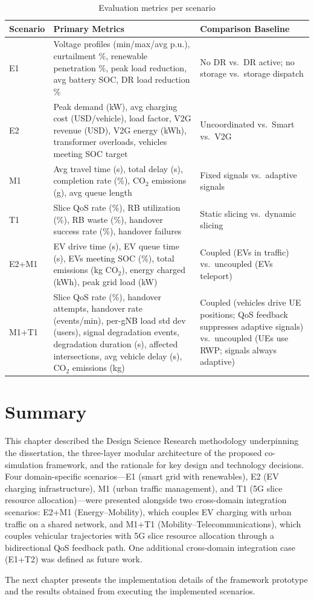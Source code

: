 \begin{table}[h]
    \centering
    \caption{Evaluation metrics per scenario}
    \label{tab:metrics_summary}
    \small
    \begin{tabular}{|p{1.5cm}|p{5.0cm}|p{6.0cm}|}
        \hline
        \textbf{Scenario} & \textbf{Primary Metrics} & \textbf{Comparison Baseline} \\
        \hline
        E1 & Voltage profiles (min/max/avg p.u.), curtailment \%, renewable penetration \%, peak load reduction, avg battery SOC, DR load reduction \% & No DR vs.\ DR active; no storage vs.\ storage dispatch \\
        \hline
        E2 & Peak demand (kW), avg charging cost (USD/vehicle), load factor, V2G revenue (USD), V2G energy (kWh), transformer overloads, vehicles meeting SOC target & Uncoordinated vs.\ Smart vs.\ V2G \\
        \hline
        M1 & Avg travel time (s), total delay (s), completion rate (\%), CO$_2$ emissions (g), avg queue length & Fixed signals vs.\ adaptive signals \\
        \hline
        T1 & Slice QoS rate (\%), RB utilization (\%), RB waste (\%), handover success rate (\%), handover failures & Static slicing vs.\ dynamic slicing \\
        \hline
        E2+M1 & EV drive time (s), EV queue time (s), EVs meeting SOC (\%), total emissions (kg CO$_2$), energy charged (kWh), peak grid load (kW) & Coupled (EVs in traffic) vs.\ uncoupled (EVs teleport) \\
        \hline
        M1+T1 & Slice QoS rate (\%), handover attempts, handover rate (events/min), per-gNB load std dev (users), signal degradation events, degradation duration (s), affected intersections, avg vehicle delay (s), CO$_2$ emissions (kg) & Coupled (vehicles drive UE positions; QoS feedback suppresses adaptive signals) vs.\ uncoupled (UEs use RWP; signals always adaptive) \\
        \hline
    \end{tabular}
\end{table}


\section{Summary}

This chapter described the Design Science Research methodology underpinning the dissertation, the three-layer modular architecture of the proposed co-simulation framework, and the rationale for key design and technology decisions. Four domain-specific scenarios---E1 (smart grid with renewables), E2 (EV charging infrastructure), M1 (urban traffic management), and T1 (5G slice resource allocation)---were presented alongside two cross-domain integration scenarios: E2+M1 (Energy--Mobility), which couples EV charging with urban traffic on a shared network, and M1+T1 (Mobility--Telecommunications), which couples vehicular trajectories with 5G slice resource allocation through a bidirectional QoS feedback path. One additional cross-domain integration case (E1+T2) was defined as future work.

The next chapter presents the implementation details of the framework prototype and the results obtained from executing the implemented scenarios.

